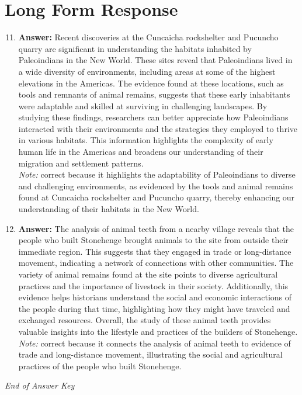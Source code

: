 \documentclass[12pt]{article}
\begin{document}
\section*{Long Form Response}
\begin{enumerate}[label=\arabic*.]
\setcounter{enumi}{10}
\item \textbf{Answer:} Recent discoveries at the Cuncaicha rockshelter and Pucuncho quarry are significant in understanding the habitats inhabited by Paleoindians in the New World. These sites reveal that Paleoindians lived in a wide diversity of environments, including areas at some of the highest elevations in the Americas. The evidence found at these locations, such as tools and remnants of animal remains, suggests that these early inhabitants were adaptable and skilled at surviving in challenging landscapes. By studying these findings, researchers can better appreciate how Paleoindians interacted with their environments and the strategies they employed to thrive in various habitats. This information highlights the complexity of early human life in the Americas and broadens our understanding of their migration and settlement patterns.
\\ \textit{Note:} correct because it highlights the adaptability of Paleoindians to diverse and challenging environments, as evidenced by the tools and animal remains found at Cuncaicha rockshelter and Pucuncho quarry, thereby enhancing our understanding of their habitats in the New World.
\item \textbf{Answer:} The analysis of animal teeth from a nearby village reveals that the people who built Stonehenge brought animals to the site from outside their immediate region. This suggests that they engaged in trade or long-distance movement, indicating a network of connections with other communities. The variety of animal remains found at the site points to diverse agricultural practices and the importance of livestock in their society. Additionally, this evidence helps historians understand the social and economic interactions of the people during that time, highlighting how they might have traveled and exchanged resources. Overall, the study of these animal teeth provides valuable insights into the lifestyle and practices of the builders of Stonehenge.
\\ \textit{Note:} correct because it connects the analysis of animal teeth to evidence of trade and long-distance movement, illustrating the social and agricultural practices of the people who built Stonehenge.
\end{enumerate}

\vfill
\noindent\textit{End of Answer Key}
\end{document}
